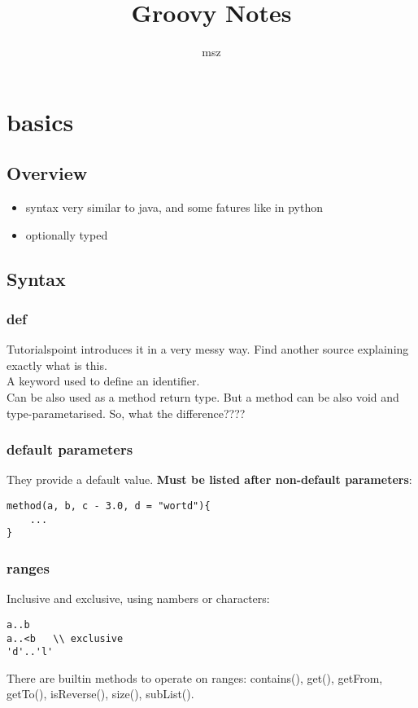 \documentclass{report}
\title{Groovy Notes}
\author{msz}
\begin{document}
\part{basics}



\chapter{Overview}


\begin{itemize}
  \item syntax very similar to java, and some fatures like in python
  \item optionally typed
\end{itemize}



\chapter{Syntax}


\section{def}
Tutorialspoint introduces it in a very messy way. Find another source explaining
exactly what is this.\\
A keyword used to define an identifier.\\
Can be also used as a method return type. But a method can be also void and
type-parametarised. So, what the difference????


\section{default parameters}
They provide a default value. \textbf{Must be listed after non-default
parameters}:
\begin{verbatim}
method(a, b, c - 3.0, d = "wortd"){
    ...
}
\end{verbatim}


\section{ranges}
Inclusive and exclusive, using nambers or characters:
\begin{verbatim}
a..b
a..<b   \\ exclusive
'd'..'l'
\end{verbatim}
There are builtin methods to operate on ranges:
contains(), get(), getFrom{}, getTo(), isReverse(), size(), subList().
\end{document}
